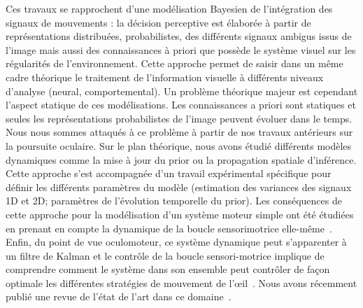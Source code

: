 \documentclass[11pt,french,a4paper,oneside]{article}%
\begin{document}
Ces travaux se rapprochent d'une modélisation Bayesien de l'intégration des signaux de mouvements : la décision perceptive est élaborée à partir de représentations distribuées, probabilistes, des différents signaux ambigus issus de l'image mais aussi des connaissances à priori que possède le système visuel sur les régularités de l'environnement. Cette approche permet de saisir dans un même cadre théorique le traitement de l'information visuelle à différents niveaux d'analyse (neural, comportemental). Un problème théorique majeur est cependant l'aspect statique de ces modélisations. Les connaissances a priori sont statiques et seules les représentations probabilistes de l'image peuvent évoluer dans le temps. Nous nous sommes attaqués à ce problème à partir de nos travaux antérieurs sur la poursuite oculaire. Sur le plan théorique, nous avons étudié différents modèles dynamiques comme la mise à jour du prior ou la propagation spatiale d'inférence. Cette approche s'est accompagnée d'un travail expérimental spécifique pour définir les différents paramètres du modèle (estimation des variances des signaux 1D et 2D; paramètres de l'évolution temporelle du prior). Les conséquences de cette approche pour la modélisation d'un système moteur simple ont été étudiées en prenant en compte la dynamique de la boucle sensorimotrice elle-même~\citep{Montagnini06neurocomp,Montagnini07a,Montagnini07,Montagnini07b}. Enfin, du point de vue oculomoteur, ce système dynamique peut s'apparenter à un filtre de Kalman et le contrôle de la boucle sensori-motrice implique de comprendre comment le système dans son ensemble peut contrôler de façon optimale les différentes stratégies de mouvement de l'\oe il~\citep{Bogadhi11,Fleuriet11}. %
Nous avons récemment publié une revue de l'état de l'art dans ce domaine~\citep{Montagnini15bicv}. 
\end{document}
